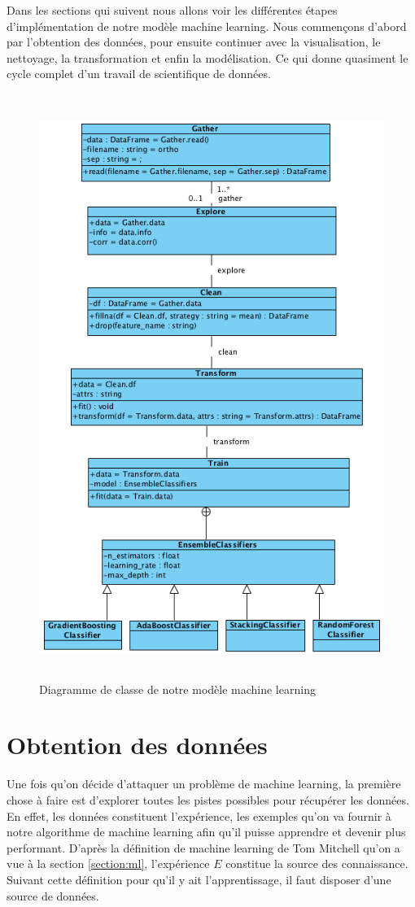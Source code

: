 \documentclass[12pt, french]{report}
\begin{document}
Dans les sections qui suivent nous allons voir les différentes étapes d'implémentation de notre modèle machine learning. Nous commençons d'abord par l'obtention des données, pour ensuite continuer avec la visualisation, le nettoyage, la transformation et enfin la modélisation. Ce qui donne quasiment le cycle complet d'un travail de scientifique de données.

\begin{figure}[p]
\includegraphics[width=13cm, height=19cm]{images/MLClassDiag.png}
\caption{Diagramme de classe de notre modèle machine learning}
\label{MLClassDiag}
\end{figure}
\newpage


\section{Obtention des données}
Une fois qu'on décide d'attaquer un problème de machine learning, la première chose à faire est d'explorer toutes les pistes possibles pour récupérer les données. En effet, les données constituent l'expérience, les exemples qu'on va fournir à notre algorithme de machine learning afin qu'il puisse apprendre et devenir plus performant. D'après la définition de machine learning de Tom Mitchell qu'on a vue à la section \ref{section:ml}, l'expérience $E$ constitue la source des connaissance. Suivant cette définition pour qu'il y ait l'apprentissage, il faut disposer d'une source de données.\\   
\end{document}
